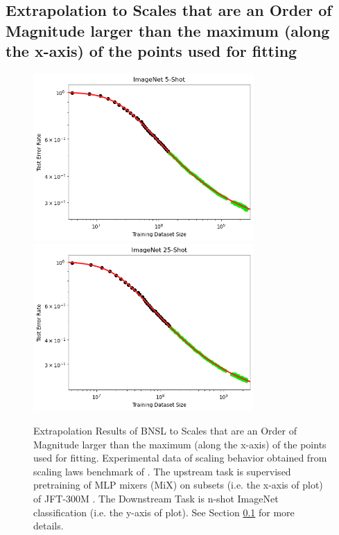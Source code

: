 \documentclass{article} %
\begin{document}
\FloatBarrier

\fi

\clearpage

\subsection{Extrapolation to Scales that are an Order of Magnitude larger than the maximum (along the x-axis) of the points used for fitting}
\label{section:extrapolate_oom}

\begin{figure}[htbp]
    \centering
\includegraphics[width=0.75\textwidth]{figures/order_of_magnitude__data_x-axis/imagenet_5___MiX_L_16.png}
\includegraphics[width=0.75\textwidth]{figures/order_of_magnitude__data_x-axis/imagenet_25___MiX_L_16.png}

    \caption{
    Extrapolation Results of BNSL to Scales that are an Order of Magnitude larger than the maximum (along the x-axis) of the points used for fitting. Experimental data of scaling behavior obtained from scaling laws benchmark of \cite{Alabdulmohsi2022revisiting}. The upstream task is supervised pretraining of MLP mixers (MiX) \citep{tolstikhin2021mlp} on subsets (i.e. the x-axis of plot) of JFT-300M \citep{sun2017revisiting}. The Downstream Task is n-shot ImageNet classification (i.e. the y-axis of plot). See Section \ref{section:extrapolate_oom} for more details.
    }
    \label{fig:extrapolate_oom}
\end{figure}
\end{document}
